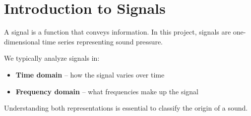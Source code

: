 \section{Introduction to Signals}

A signal is a function that conveys information. In this project, signals are one-dimensional time series representing sound pressure.

We typically analyze signals in:
\begin{itemize}
    \item \textbf{Time domain} – how the signal varies over time
    \item \textbf{Frequency domain} – what frequencies make up the signal
\end{itemize}

Understanding both representations is essential to classify the origin of a sound.
